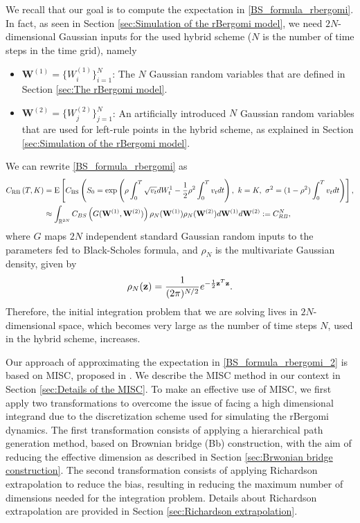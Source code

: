 We recall that our goal is to compute the expectation in \eqref{BS_formula_rbergomi}. In fact, as seen in Section \ref{sec:Simulation of the rBergomi model}, we need   $2N$-dimensional Gaussian inputs for the used  hybrid  scheme ($N$ is the number of time steps in  the time grid), namely
\begin{itemize}
	\item $\mathbf{W}^{(1)}=\{W^{(1)}_i\}_{i=1}^N$: The $N$ Gaussian random variables that are defined in Section  \ref{sec:The rBergomi model}.
	\item $\mathbf{W}^{(2)}=\{W^{(2)}_j\}_{j=1}^N$: An artificially introduced $N$ Gaussian random variables that are used for left-rule points in the hybrid scheme, as explained in Section  \ref{sec:Simulation of the rBergomi model}.
\end{itemize}
We can rewrite \eqref{BS_formula_rbergomi} as 
\begin{align}\label{BS_formula_rbergomi_2}
C_{\text{RB}}\left( T, K \right)&=\text{E}\left[C_{\text{BS}}\left( S_0 = \operatorname{exp}\left(\rho \int_0^T \sqrt{v_t} dW_t^1 - \frac{1}{2}
\rho^2 \int_0^T v_t dt\right),\ k = K, \ \sigma^2 = (1-\rho^2)
\int_0^T v_t dt \right) \right], \nonumber \\
&\approx \int_{\mathbb{R}^{2N}} C_{BS} \left(G(\mathbf{W}^{(1)},\mathbf{W}^{(2)})\right) \rho_{N}(\mathbf{W}^{(1)})  \rho_{N}(\mathbf{W}^{(2)}) d\mathbf{W}^{(1)} d\mathbf{W}^{(2)}:=C_{RB}^{N},
\end{align}
where $G$  maps  $2N$ independent standard Gaussian random inputs to the parameters fed to Black-Scholes formula, and  $\rho_N$ is the multivariate Gaussian density, given by 
\begin{equation*}\label{eq: multivariate gaussian distribution}
\rho_N(\mathbf{z})=\frac{1}{(2 \pi)^{N/2}} e^{-\frac{1}{2} \mathbf{z}^T \mathbf{z}} .
\end{equation*} 
Therefore, the initial integration problem that we are solving lives in $2N$-dimensional space, which becomes very large as the number of time steps $N$, used in the hybrid scheme, increases.

Our approach of approximating the expectation in \eqref{BS_formula_rbergomi_2} is based on MISC, proposed in \cite{haji2016multi}. We describe the  MISC method in our context in Section \ref{sec:Details of the MISC}.  To make an effective use of MISC, we  first apply two transformations to overcome the issue of facing a high dimensional integrand due to the discretization scheme used for simulating the rBergomi dynamics. The first transformation consists of applying a hierarchical  path generation method, based on Brownian bridge (Bb) construction, with the aim of reducing the effective dimension as  described  in Section \ref{sec:Brwonian bridge construction}. The second transformation consists of applying Richardson extrapolation to reduce the bias, resulting in reducing  the maximum number of dimensions needed for the integration problem. Details about  Richardson extrapolation  are provided in Section \ref{sec:Richardson extrapolation}.

